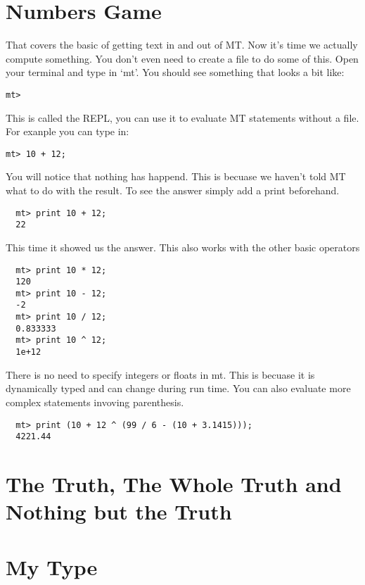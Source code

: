 \documentclass{report}
\begin{document}
\section{Numbers Game}
That covers the basic of getting text in and out of MT. Now it's time we actually compute something. You don't even need to create a file to do some of this. Open your terminal and type in `mt'. You should see something that looks a bit like:
\begin{lstlisting}
mt>
\end{lstlisting}
This is called the REPL, you can use it to evaluate MT statements without a file. For exanple you can type in:
\begin{lstlisting}
mt> 10 + 12;
\end{lstlisting}
You will notice that nothing has happend. This is becuase we haven't told MT what to do with the result. To see the answer simply add a print beforehand.
\begin{lstlisting}
  mt> print 10 + 12;
  22
\end{lstlisting}
This time it showed us the answer. This also works with the other basic operators
\begin{lstlisting}
  mt> print 10 * 12;
  120
  mt> print 10 - 12;
  -2
  mt> print 10 / 12;
  0.833333
  mt> print 10 ^ 12;
  1e+12
\end{lstlisting}
There is no need to specify integers or floats in mt. This is becuase it is dynamically typed and can change during run time. You can also evaluate more complex statements invoving parenthesis.
\begin{lstlisting}
  mt> print (10 + 12 ^ (99 / 6 - (10 + 3.1415)));
  4221.44
\end{lstlisting}

\section{The Truth, The Whole Truth and Nothing but the Truth}

\section{My Type}
\end{document}

